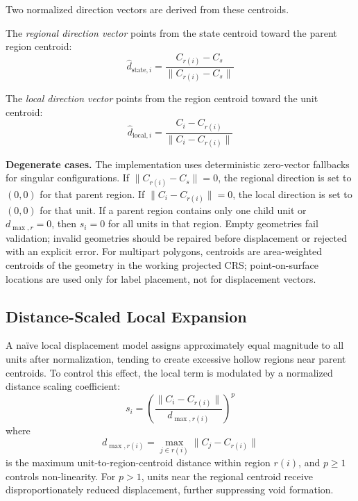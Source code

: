 \documentclass[12pt, a4paper]{article}
\numberwithin{equation}{section}
\begin{document}
Two normalized direction vectors are derived from these centroids.

The \emph{regional direction vector} points from the state centroid toward the parent region centroid:
\begin{equation}
  \hat{d}_{\text{state},i} = \frac{C_{r(i)} - C_s}{\|C_{r(i)} - C_s\|}
  \label{eq:dstate}
\end{equation}

The \emph{local direction vector} points from the region centroid toward the unit centroid:
\begin{equation}
  \hat{d}_{\text{local},i} = \frac{C_i - C_{r(i)}}{\|C_i - C_{r(i)}\|}
  \label{eq:dlocal}
\end{equation}

\noindent\textbf{Degenerate cases.} The implementation uses deterministic zero-vector fallbacks for singular configurations. If $\|C_{r(i)} - C_s\| = 0$, the regional direction is set to $(0,0)$ for that parent region. If $\|C_i - C_{r(i)}\| = 0$, the local direction is set to $(0,0)$ for that unit. If a parent region contains only one child unit or $d_{\max,r}=0$, then $s_i=0$ for all units in that region. Empty geometries fail validation; invalid geometries should be repaired before displacement or rejected with an explicit error. For multipart polygons, centroids are area-weighted centroids of the geometry in the working projected CRS; point-on-surface locations are used only for label placement, not for displacement vectors.

\subsection{Distance-Scaled Local Expansion}

A naïve local displacement model assigns approximately equal magnitude to all units after normalization, tending to create excessive hollow regions near parent centroids. To control this effect, the local term is modulated by a normalized distance scaling coefficient:
\begin{equation}
  s_i = \left(\frac{\|C_i - C_{r(i)}\|}{d_{\max,r(i)}}\right)^{p}
  \label{eq:si}
\end{equation}
where
\begin{equation}
  d_{\max,r(i)} = \max_{j \in r(i)} \|C_j - C_{r(i)}\|
  \label{eq:dmax}
\end{equation}
is the maximum unit-to-region-centroid distance within region $r(i)$, and $p \geq 1$ controls non-linearity. For $p > 1$, units near the regional centroid receive disproportionately reduced displacement, further suppressing void formation.
\end{document}
